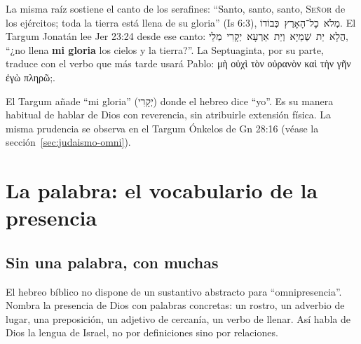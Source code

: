 \documentclass[11pt,letterpaper]{article}
\newcommand{\heb}[1]{\mbox{\foreignlanguage{hebrew}{#1}}}
\newcommand{\grc}[1]{\foreignlanguage{ancientgreek}{#1}}
\newcommand{\SENOR}{\textsc{Señor}}
\newcommand{\destacar}[1]{\textbf{\textcolor{azul}{#1}}}
\begin{document}
La misma raíz sostiene el canto de los serafines: ``Santo, santo, santo, \SENOR{} de los ejércitos; toda la tierra está llena de su gloria'' (Is 6:3), \heb{מְלֹא כָל־הָאָרֶץ כְּבוֹדוֹ}. El Targum Jonatán lee Jer 23:24 desde ese canto: \heb{הֲלָא יַת שְׁמַיָא וְיַת אַרְעָא יְקָרִי מְלֵי}, ``¿no llena \destacar{mi gloria} los cielos y la tierra?''. La Septuaginta, por su parte, traduce con el verbo que más tarde usará Pablo: \grc{μὴ οὐχὶ τὸν οὐρανὸν καὶ τὴν γῆν ἐγὼ πληρῶ;}.

\begin{nota}[Precisión]
El Targum añade ``mi gloria'' (\heb{יְקָרִי}) donde el hebreo dice ``yo''. Es su manera habitual de hablar de Dios con reverencia, sin atribuirle extensión física. La misma prudencia se observa en el Targum Ónkelos de Gn 28:16 (véase la sección~\ref{sec:judaismo-omni}).
\end{nota}

\section{La palabra: el vocabulario de la presencia}

\subsection{Sin una palabra, con muchas}

El hebreo bíblico no dispone de un sustantivo abstracto para ``omnipresencia''. Nombra la presencia de Dios con palabras concretas: un rostro, un adverbio de lugar, una preposición, un adjetivo de cercanía, un verbo de llenar. Así habla de Dios la lengua de Israel, no por definiciones sino por relaciones.
\end{document}
